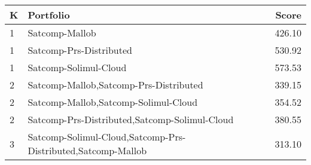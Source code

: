 \begin{tabular}{l|p{.9\linewidth}|r}
\toprule
K & Portfolio & Score \\
\midrule
1 & Satcomp-Mallob & 426.10 \\
1 & Satcomp-Prs-Distributed & 530.92 \\
1 & Satcomp-Solimul-Cloud & 573.53 \\
2 & Satcomp-Mallob,Satcomp-Prs-Distributed & 339.15 \\
2 & Satcomp-Mallob,Satcomp-Solimul-Cloud & 354.52 \\
2 & Satcomp-Prs-Distributed,Satcomp-Solimul-Cloud & 380.55 \\
3 & Satcomp-Solimul-Cloud,Satcomp-Prs-Distributed,Satcomp-Mallob & 313.10 \\
\bottomrule
\end{tabular}
